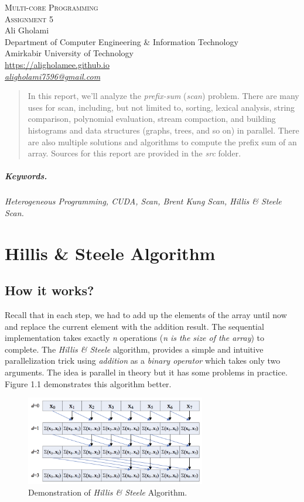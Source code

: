 \documentclass[12pt]{article}
\numberwithin{equation}{section}
\numberwithin{table}{section}
\numberwithin{figure}{section}
\begin{document}

\begin{center}
\textsc{\Huge Multi-core Programming} \\[2pt]
	\textsc{\Large Assignment 5}\\
	\vspace{0.5cm}
  Ali Gholami \\[6pt]
  Department of Computer Engineering \& Information Technology\\
  Amirkabir University of Technology  \\[6pt]
  \def\UrlFont{\em}
  \url{https://aligholamee.github.io}\\
\href{mailto:aligholami7596@gmail.com}{\textit{aligholami7596@gmail.com}}
\end{center}

\begin{abstract}
In this report, we'll analyze the \textit{prefix-sum} (\textit{scan}) problem. There are many uses for scan, including, but not limited to, sorting, lexical analysis, string comparison, polynomial evaluation, stream compaction, and building histograms and data structures (graphs, trees, and so on) in parallel. There are also multiple solutions and algorithms to compute the prefix sum of an array. Sources for this report are provided in the \textit{src} folder. 
\end{abstract} 

\subparagraph{Keywords.} \textit{ Heterogeneous Programming, CUDA, Scan, Brent Kung Scan, Hillis \& Steele Scan.}

\section{Hillis \& Steele Algorithm}
\subsection{How it works?}
Recall that in each step, we had to add up the elements of the array until now and replace the current element with the addition result. The sequential implementation takes exactly \textit{n} operations (\textit{n is the size of the array}) to complete. The \textit{Hillis \& Steele} algorithm, provides a simple and intuitive parallelization trick using \textit{addition} as a \textit{binary operator} which takes only two arguments. The idea is parallel in theory but it has some problems in practice. Figure 1.1 demonstrates this algorithm better.
\begin{figure}[!h]\centering
	\includegraphics[width=0.7\textwidth]{1_1.png}
	\caption{Demonstration of \textit{Hillis \& Steele} Algorithm.}
	\label{pl1}
\end{figure}
\end{document}
